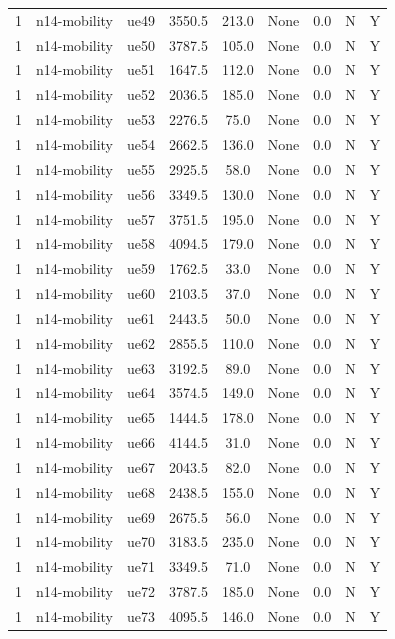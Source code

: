 \begin{table}[ht]
\begin{tabular}{|c|c|c|c|c|c|c|c|c|}
1 & n14-mobility & ue49 & 3550.5 & 213.0 & None & 0.0 & N & Y \\
1 & n14-mobility & ue50 & 3787.5 & 105.0 & None & 0.0 & N & Y \\
1 & n14-mobility & ue51 & 1647.5 & 112.0 & None & 0.0 & N & Y \\
1 & n14-mobility & ue52 & 2036.5 & 185.0 & None & 0.0 & N & Y \\
1 & n14-mobility & ue53 & 2276.5 & 75.0 & None & 0.0 & N & Y \\
1 & n14-mobility & ue54 & 2662.5 & 136.0 & None & 0.0 & N & Y \\
1 & n14-mobility & ue55 & 2925.5 & 58.0 & None & 0.0 & N & Y \\
1 & n14-mobility & ue56 & 3349.5 & 130.0 & None & 0.0 & N & Y \\
1 & n14-mobility & ue57 & 3751.5 & 195.0 & None & 0.0 & N & Y \\
1 & n14-mobility & ue58 & 4094.5 & 179.0 & None & 0.0 & N & Y \\
1 & n14-mobility & ue59 & 1762.5 & 33.0 & None & 0.0 & N & Y \\
1 & n14-mobility & ue60 & 2103.5 & 37.0 & None & 0.0 & N & Y \\
1 & n14-mobility & ue61 & 2443.5 & 50.0 & None & 0.0 & N & Y \\
1 & n14-mobility & ue62 & 2855.5 & 110.0 & None & 0.0 & N & Y \\
1 & n14-mobility & ue63 & 3192.5 & 89.0 & None & 0.0 & N & Y \\
1 & n14-mobility & ue64 & 3574.5 & 149.0 & None & 0.0 & N & Y \\
1 & n14-mobility & ue65 & 1444.5 & 178.0 & None & 0.0 & N & Y \\
1 & n14-mobility & ue66 & 4144.5 & 31.0 & None & 0.0 & N & Y \\
1 & n14-mobility & ue67 & 2043.5 & 82.0 & None & 0.0 & N & Y \\
1 & n14-mobility & ue68 & 2438.5 & 155.0 & None & 0.0 & N & Y \\
1 & n14-mobility & ue69 & 2675.5 & 56.0 & None & 0.0 & N & Y \\
1 & n14-mobility & ue70 & 3183.5 & 235.0 & None & 0.0 & N & Y \\
1 & n14-mobility & ue71 & 3349.5 & 71.0 & None & 0.0 & N & Y \\
1 & n14-mobility & ue72 & 3787.5 & 185.0 & None & 0.0 & N & Y \\
1 & n14-mobility & ue73 & 4095.5 & 146.0 & None & 0.0 & N & Y \\

\end{tabular}
\end{table}
